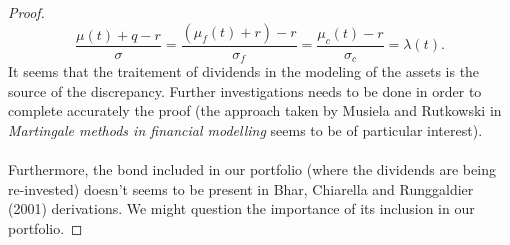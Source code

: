 \documentclass{article}
\theoremstyle{definition}
\theoremstyle{remark}
\begin{document}
\begin{proof}
\begin{equation*}
\frac{\mu(t)+q-r}{\sigma}=\frac{(\mu_f(t)+r)-r}{\sigma_f}=\frac{\mu_c(t)-r}{\sigma_c}=\lambda(t).
\end{equation*}
It seems that the traitement of dividends in the modeling of the assets is the source of the discrepancy. Further investigations needs to be done in order to complete accurately the proof (the approach taken by Musiela and Rutkowski in \emph{Martingale methods in financial modelling} seems to be of particular interest).\\
\\
Furthermore, the bond included in our portfolio (where the dividends are being re-invested) doesn't seems to be present in Bhar, Chiarella and Runggaldier (2001) derivations. We might question the importance of its inclusion in our portfolio.
\end{proof}
\end{document}
